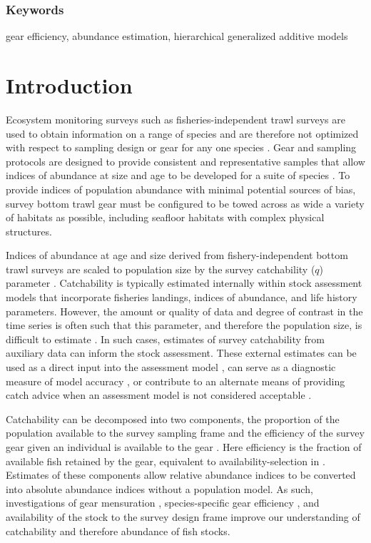 \documentclass[
  12pt,
]{article}
\begin{document}
\hypertarget{keywords}{%
\subsubsection*{Keywords}\label{keywords}}

gear efficiency, abundance estimation, hierarchical generalized additive
models

\pagebreak

\hypertarget{introduction}{%
\section{Introduction}\label{introduction}}

Ecosystem monitoring surveys such as fisheries-independent trawl surveys
are used to obtain information on a range of species and are therefore
not optimized with respect to sampling design or gear for any one
species \citep{bijleveldetal12, wangetal18}. Gear and sampling protocols
are designed to provide consistent and representative samples that allow
indices of abundance at size and age to be developed for a suite of
species \citep{azarovitz81, thiessetal18}. To provide indices of
population abundance with minimal potential sources of bias, survey
bottom trawl gear must be configured to be towed across as wide a
variety of habitats as possible, including seafloor habitats with
complex physical structures.

Indices of abundance at age and size derived from fishery-independent
bottom trawl surveys are scaled to population size by the survey
catchability (\(q\)) parameter \citep{arreguinsanchez96}. Catchability
is typically estimated internally within stock assessment models that
incorporate fisheries landings, indices of abundance, and life history
parameters. However, the amount or quality of data and degree of
contrast in the time series is often such that this parameter, and
therefore the population size, is difficult to estimate
\citep{maunderpiner15}. In such cases, estimates of survey catchability
from auxiliary data can inform the stock assessment. These external
estimates can be used as a direct input into the assessment model
\citep{somertonetal99}, can serve as a diagnostic measure of model
accuracy \citep{milleretal19}, or contribute to an alternate means of
providing catch advice when an assessment model is not considered
acceptable \citep{legaultmccurdy17}.

Catchability can be decomposed into two components, the proportion of
the population available to the survey sampling frame and the efficiency
of the survey gear given an individual is available to the gear
\citep{paloheimodickie64}. Here efficiency is the fraction of available
fish retained by the gear, equivalent to availability-selection in
\citet{millarfryer99}. Estimates of these components allow relative
abundance indices to be converted into absolute abundance indices
without a population model. As such, investigations of gear mensuration
\citep{kotwickietal11}, species-specific gear efficiency
\citep{thygesenetal19}, and availability of the stock to the survey
design frame \citep{nicholetal19} improve our understanding of
catchability and therefore abundance of fish stocks.
\end{document}
